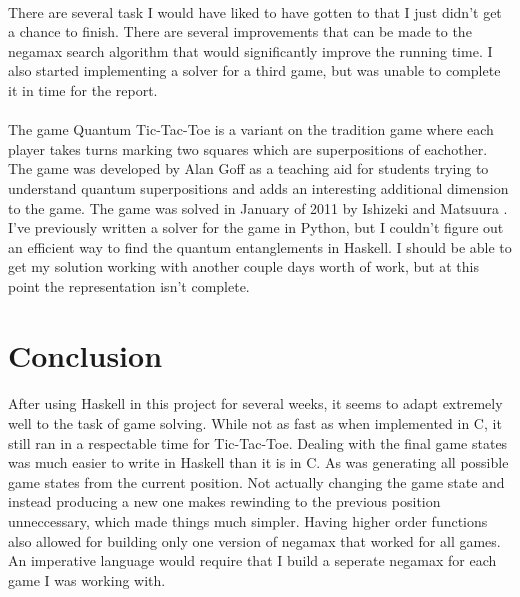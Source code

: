\documentclass[10pt]{article}
\begin{document}
\paragraph{} There are several task I would have liked to have gotten to that I 
just didn't get a chance to finish.  There are several improvements that can be 
made to the negamax search algorithm that would significantly improve the running 
time.  I also started implementing a solver for a third game, but was unable to 
complete it in time for the report.

\paragraph{} The game Quantum Tic-Tac-Toe is a variant on the tradition game where 
each player takes turns marking two squares which are superpositions of eachother.
The game was developed by Alan Goff as a teaching aid for students trying to 
understand quantum superpositions \cite{qtttdesign} and adds an interesting 
additional dimension to the game.  The game was solved in January of 2011 by
Ishizeki and Matsuura \cite{qtttsolved}.  I've previously written a solver for the 
game in Python, but I couldn't figure out an efficient way to find the quantum 
entanglements in Haskell.  I should be able to get my solution working with another
couple days worth of work, but at this point the representation isn't complete.

\section{Conclusion}
\paragraph{} After using Haskell in this project for several weeks, it seems to
adapt extremely well to the task of game solving.  While not as fast as when
implemented in C, it still ran in a respectable time for Tic-Tac-Toe.  Dealing
with the final game states was much easier to write in Haskell than it is in C.  
As was generating all possible game states from the current position.  Not actually
changing the game state and instead producing a new one makes rewinding to the
previous position unneccessary, which made things much simpler.  Having higher
order functions also allowed for building only one version of negamax that 
worked for all games.  An imperative language would require that I build a 
seperate negamax for each game I was working with.
\end{document}
